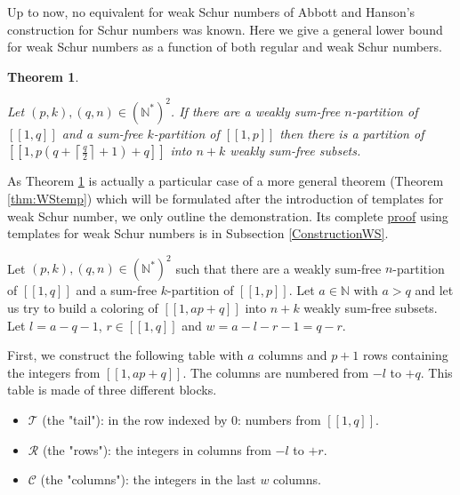 \documentclass{article}
\newtheorem{theorem}[definition]{Theorem}
\newtheorem{computational theorem}[definition]{Computational Theorem}
\begin{document}
Up to now, no equivalent for weak Schur numbers of Abbott and Hanson's construction for Schur numbers
\cite{AbbottHanson} was known. Here we give a general lower bound for weak Schur numbers as a function of both
regular and weak Schur numbers.

\begin{theorem}
\label{thm:WS-ab}
\begin{sloppypar}
Let \((p,k), (q,n) \in (\mathbb{N}^*)^2\). If there are a weakly sum-free \(n\)-partition of \([\![1,q]\!]\)
and a sum-free \(k\)-partition of \([\![1,p]\!]\) then there is a partition of
\({[\![1,p(q+\left \lceil \frac{q}{2} \right \rceil + 1)+q]\!]}\) into \(n+k\) weakly sum-free subsets.
\end{sloppypar}
\end{theorem}

As Theorem \ref{thm:WS-ab} is actually a particular case of a more general theorem (Theorem \ref{thm:WStemp}) which will
be formulated after the introduction of templates for weak Schur number,
we only outline the demonstration. Its complete \hyperref[PreuveThm]{proof} using templates 
for weak Schur numbers is in Subsection \ref{ConstructionWS}.

Let \((p, k), (q, n) \in (\mathbb{N}^*)^2\) such that there are a weakly sum-free \(n\)-partition of \([\![1,q]\!]\) 
and a sum-free \(k\)-partition of \([\![1,p]\!]\). Let \(a \in \mathbb{N}\) with \(a > q\)
and let us try to build a coloring of \([\![1, ap + q]\!]\) into \(n + k\) weakly sum-free subsets. Let
\(l = a - q - 1\), \(r \in [\![1,q]\!]\) and \(w = a - l - r - 1 = q - r\).

First, we construct the following table with \(a\) columns and \(p+1\) rows containing the integers from \([\![1, ap + q]\!]\). 
The columns are numbered from \(-l\) to \(+q\). This table is made of three different blocks.

\begin{itemize}
	\item \(\mathcal{T}\) (the "tail"): in the row indexed by 0: numbers from \([\![1,q]\!]\).
	\item \(\mathcal{R}\) (the "rows"): the integers in columns from \(-l\) to \(+r\).
	\item \(\mathcal{C}\) (the "columns"): the integers in the last \(w\) columns.
\end{itemize}

\setlength{\arraycolsep}{2pt}
\end{document}
